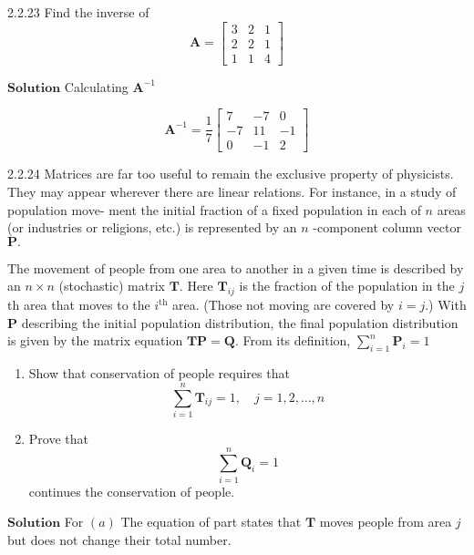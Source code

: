 \documentclass{styles/kaobook}
\begin{document}
\begin{greenbox}{2.2.23}
Find the inverse of
$$
\mathbf{A}=\begin{bmatrix}{3} & {2} & {1} \\ {2} & {2} & {1} \\ {1} & {1} & {4}\end{bmatrix}
$$
\end{greenbox}


$\boxed{\textbf{Solution}}$ Calculating $\mathbf{A}^{-1}$


$$\mathbf{A}^{-1}=\frac{1}{7}\begin{bmatrix}{7} & {-7} & {0} \\ {-7} & {11} & {-1} \\ {0} & {-1} & {2}\end{bmatrix}$$


\begin{greenbox}{2.2.24}
Matrices are far too useful to remain the exclusive property of physicists. They may
appear wherever there are linear relations. For instance, in a study of population move-
ment the initial fraction of a fixed population in each of $n$ areas (or industries or
religions, etc.) is represented by an $n$ -component column vector $\mathbf{P} .$ 

The movement of people from one area to another in a given time is described by an $n \times n$ (stochastic) matrix $\mathbf{T}$. Here $\mathbf{T}_{i j}$ is the fraction of the population in the $j$ th area that moves to the $i^{\text{th}}$ area. (Those not moving are covered by $i=j.$) With $\mathbf{P}$ describing the initial population distribution, the final population distribution is given by the matrix equation $\mathbf{TP}=\mathbf{Q}$. From its definition, $\sum_{i=1}^{n} \mathbf{P}_{i}=1$

\begin{enumerate}[$(a)$]
\item Show that conservation of people requires that
$$
\sum_{i=1}^{n} \mathbf{T}_{i j}=1, \quad j=1,2, \ldots, n
$$
\item Prove that
$$
\sum_{i=1}^{n} \mathbf{Q}_{i}=1
$$
continues the conservation of people.
\end{enumerate}
\end{greenbox}




$\boxed{\textbf{Solution}}$  For $(a)$ The equation of part states that $\mathbf{T}$ moves people from area $j$ but
does not change their total number. 
\end{document}
